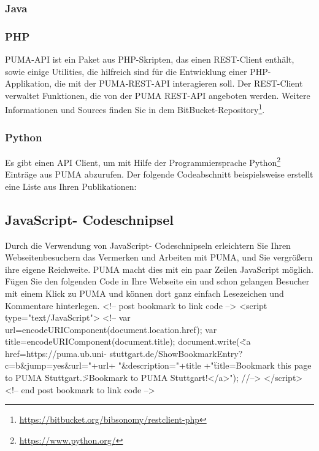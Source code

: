 \documentclass[a4paper,11pt,twoside]{scrbook}
\begin{document}
\subsubsection{Java}    


\subsubsection{PHP}
PUMA-API ist ein Paket aus PHP-Skripten, das einen REST-Client enthält, sowie einige Utilities, die hilfreich sind für die Entwicklung einer PHP-Applikation, die mit der PUMA-REST-API interagieren soll. Der REST-Client verwaltet Funktionen, die von der PUMA REST-API angeboten werden.
\newline
Weitere Informationen und Sources finden Sie in dem BitBucket-Repository\footnote{\url{https://bitbucket.org/bibsonomy/restclient-php}}.  

\subsubsection{Python}
Es gibt einen API Client, um mit Hilfe der Programmiersprache Python\footnote{\url{https://www.python.org/}} Einträge aus PUMA abzurufen. Der folgende Codeabschnitt beispielsweise erstellt eine Liste aus Ihren Publikationen:

 


\subsection{JavaScript- Codeschnipsel}
Durch die Verwendung von JavaScript- Codeschnipseln erleichtern Sie Ihren Webseitenbesuchern das Vermerken und Arbeiten mit PUMA, und Sie vergrößern ihre eigene Reichweite. PUMA macht dies mit ein paar Zeilen JavaScript möglich. Fügen Sie den folgenden Code in Ihre Webseite ein und schon gelangen Besucher mit einem Klick zu PUMA und können dort ganz einfach Lesezeichen und Kommentare hinterlegen.
\newline
\newline
<!-- post bookmark to link code -->\newline
      <script type="text/JavaScript">\newline
      <!--\newline
      var url=encodeURIComponent(document.location.href);\newline
      var title=encodeURIComponent(document.title);\newline
      document.write(\"<a href=https://puma.ub.uni-	stuttgart.de/ShowBookmarkEntry?c=b\&jump=yes\&url="+url+ "\&description="+title +"\" title=\"Bookmark this page to PUMA Stuttgart.\">Bookmark to PUMA Stuttgart!</a>");\newline%
      //-->\newline
      </script>\newline
      <!-- end post bookmark to link code -->\newline
\end{document}
